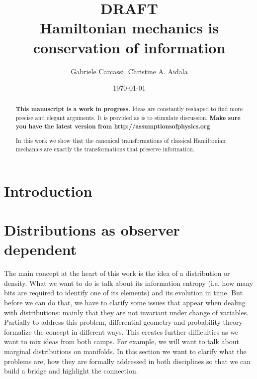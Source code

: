 \documentclass[smallextended]{svjour3}
\numberwithin{equation}{section}
\theoremstyle{definition}
\newcommand{\journal}[1]{\ifjournal#1\fi}
\newcommand{\arxiv}[1]{\ifjournal\else#1\fi}
\begin{document}
\title{DRAFT \\ Hamiltonian mechanics is conservation of information}
\author{Gabriele Carcassi, Christine A. Aidala}

\ifjournal
\else
\fi


\date{\today}

\journal{\maketitle}
	
\begin{abstract}
\textbf{This manuscript is a work in progress.} Ideas are constantly reshaped to find more precise and elegant arguments. It is provided as is to stimulate discussion.  \textbf{Make sure you have the latest version from http://assumptionsofphysics.org}

In this work we show that the canonical transformations of classical Hamiltonian mechanics are exactly the transformations that preserve information.
\end{abstract}

\arxiv{\maketitle}

\section{Introduction}

\section{Distributions as observer dependent}

The main concept at the heart of this work is the idea of a distribution or density. What we want to do is talk about its information entropy (i.e. how many bits are required to identify one of its elements) and its evolution in time. But before we can do that, we have to clarify some issues that appear when dealing with distributions: mainly that they are not invariant under change of variables. Partially to address this problem, differential geometry and probability theory formalize the concept in different ways. This creates further difficulties as we want to mix ideas from both camps. For example, we will want to talk about marginal distributions on manifolds. In this section we want to clarify what the problems are, how they are formally addressed in both disciplines so that we can build a bridge and highlight the connection.
\end{document}
